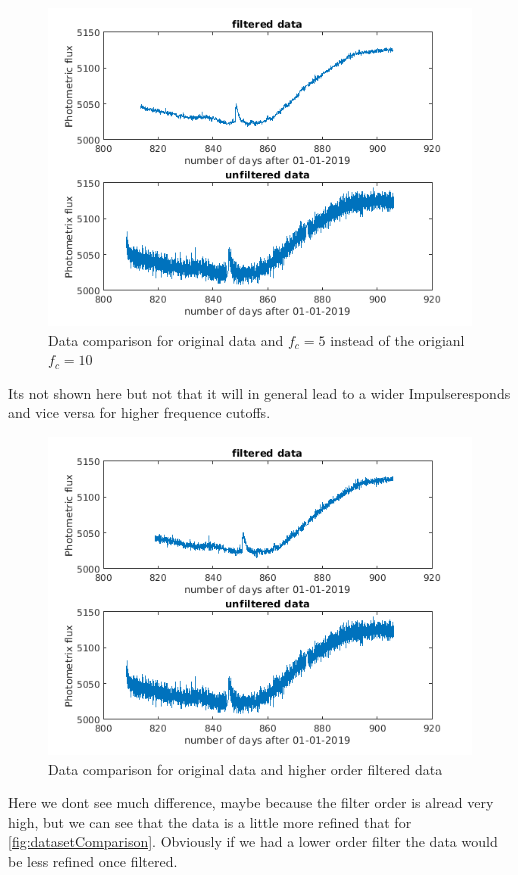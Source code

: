 \begin{figure}[h]
  \centering
  \includegraphics[scale=0.60]{matlabStuff/FIR20CutOff.png}
  \caption{Data comparison for original data and $f_{c}=5$ instead of the origianl $f_c = 10$}%
  \label{fig:resultingTransferFuntion20cutoff}
\end{figure}

Its not shown here but not that it will in general lead to a
wider Impulseresponds and vice versa for higher frequence cutoffs.

\begin{figure}[h]
  \centering
  \includegraphics[scale=0.60]{matlabStuff/datasetHigherOrder.png}
  \caption{Data comparison for original data and higher order filtered data}%
  \label{fig:resultingTransferFuntion20cutoff}
\end{figure}

Here we dont see much difference, maybe because the filter order is alread very high, but we can see that the data is a little more refined that for \autoref{fig:datasetComparison}.
Obviously if we had a lower order filter the data would be less refined once filtered.



\newpage


